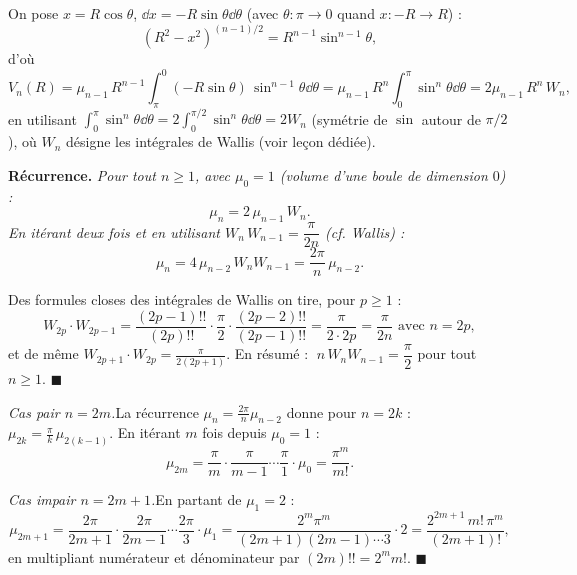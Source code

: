 On pose $x = R\cos\theta$, $\dd x = -R\sin\theta\dd\theta$
(avec $\theta : \pi \to 0$ quand $x : -R \to R$) :
\[
  {(R^2-x^2)}^{(n-1)/2} = R^{n-1}\sin^{n-1}\theta,
\]
d'où
\[
  V_n(R) = \mu_{n-1}\,R^{n-1}\int_{\pi}^{0}(-R\sin\theta)\,\sin^{n-1}\theta\dd\theta
  = \mu_{n-1}\,R^n\int_0^{\pi}\sin^n\theta\dd\theta
  = 2\mu_{n-1}\,R^n\,W_n,
\]
en utilisant $\int_0^{\pi}\sin^n\theta\dd\theta = 2\int_0^{\pi/2}\sin^n\theta\dd\theta = 2W_n$
(symétrie de $\sin$ autour de $\pi/2$), où $W_n$ désigne les intégrales de Wallis
(voir leçon dédiée).

\begin{tcolorbox}[thmbox]
  \textbf{Récurrence.}\enspace%
  \textit{Pour tout $n \geq 1$, avec $\mu_0 = 1$ (volume d'une boule de dimension $0$) :}
  \[
    \mu_n = 2\,\mu_{n-1}\,W_n.
  \]
  \textit{En itérant deux fois et en utilisant $W_n\,W_{n-1} = \dfrac{\pi}{2n}$ (cf. Wallis) :}
  \[
    \mu_n = 4\,\mu_{n-2}\,W_n W_{n-1} = \frac{2\pi}{n}\,\mu_{n-2}.
  \]
\end{tcolorbox}


\begin{mdframed}[style=proofbar]
  Des formules closes des intégrales de Wallis on tire, pour $p \geq 1$ :
  \[
    W_{2p}\cdot W_{2p-1} = \frac{(2p-1)!!}{(2p)!!}\cdot\frac{\pi}{2}\cdot\frac{(2p-2)!!}{(2p-1)!!}
    = \frac{\pi}{2\cdot 2p} = \frac{\pi}{2n} \text{ avec } n = 2p,
  \]
  et de même $W_{2p+1}\cdot W_{2p} = \frac{\pi}{2(2p+1)}$.
  En résumé : $\;n\,W_n W_{n-1} = \dfrac{\pi}{2}$ pour tout $n \geq 1$.
  \hfill$\blacksquare$
\end{mdframed}

\decsep{}



\begin{mdframed}[style=proofbar]
  \textit{Cas pair $n = 2m$.}\enspace{}La récurrence $\mu_n = \frac{2\pi}{n}\mu_{n-2}$
  donne pour $n=2k$ : $\mu_{2k} = \frac{\pi}{k}\,\mu_{2(k-1)}$.
  En itérant $m$ fois depuis $\mu_0 = 1$ :
  \[
    \mu_{2m} = \frac{\pi}{m}\cdot\frac{\pi}{m-1}\cdots\frac{\pi}{1}\cdot\mu_0
    = \frac{\pi^m}{m!}.
  \]

  \textit{Cas impair $n = 2m+1$.}\enspace{}En partant de $\mu_1 = 2$ :
  \[
    \mu_{2m+1}
    = \frac{2\pi}{2m+1}\cdot\frac{2\pi}{2m-1}\cdots\frac{2\pi}{3}\cdot\mu_1
    = \frac{2^m\pi^m}{(2m+1)(2m-1)\cdots 3}\cdot 2
    = \frac{2^{2m+1}\,m!\,\pi^m}{(2m+1)!},
  \]
  en multipliant numérateur et dénominateur par $(2m)!! = 2^m m!$. \hfill$\blacksquare$
\end{mdframed}

